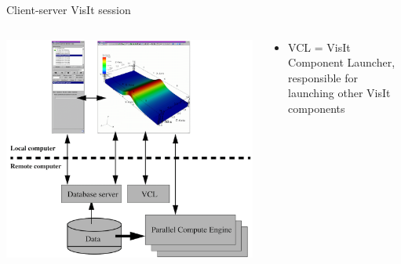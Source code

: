\begin{frame}{Client-server VisIt session}
  \vspace{-5mm}
  \begin{columns}
    \begin{column}{8.25cm}
      \includegraphics[width=\columnwidth]{figs/visit-guis/VisIt_arch}
    \end{column}
    \begin{column}{3.5cm}
      {\footnotesize
        \begin{itemize}
        \item VCL = VisIt Component Launcher, responsible for launching other VisIt components
      \end{itemize}}
    \end{column}
  \end{columns}
\end{frame}
